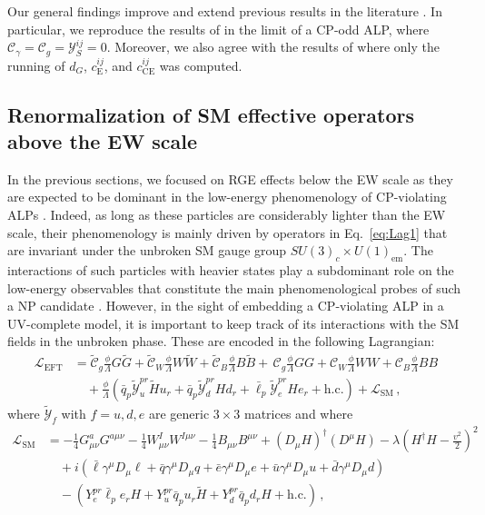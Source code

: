 Our general findings improve and extend previous results in the literature \cite{Marciano:2016yhf,Galda:2023qjx,DiLuzio:2020oah}.
In particular, we reproduce the results of \cite{Galda:2023qjx} in the limit of a CP-odd ALP, where $\mathcal C_\gamma = \mathcal C_g = \mathcal Y_S^{ij} = 0$. Moreover, we also agree with the results of \cite{Marciano:2016yhf,DiLuzio:2020oah} where only the running of $d_G$, $c_{\text{E}}^{ij}$, and $c_{\text{CE}}^{ij}$ was computed.

\subsection{Renormalization of SM effective operators above the EW scale}

In the previous sections, we focused on RGE effects below the EW scale as they are expected to be dominant in the low-energy phenomenology of CP-violating ALPs \cite{Marciano:2016yhf,DiLuzio:2020oah}. Indeed, as long as these particles are considerably lighter than the EW scale, their phenomenology is mainly driven by operators in Eq.~\eqref{eq:Lag1} that are invariant under the unbroken SM gauge group $SU(3)_c\times U(1)_\text{em}$. The interactions of such particles with heavier states play a subdominant role on the low-energy observables that constitute the main phenomenological probes of such a NP candidate \cite{DiLuzio:2020oah,DiLuzio:2023cuk}. However, in the sight of embedding a CP-violating ALP in a UV-complete model, it is important to keep track of its interactions with the SM fields in the unbroken phase.
These are encoded in the following Lagrangian: 
\begin{align}
\mathcal{L}_\text{EFT} &= \tilde{\mathcal{C}}_{g}\frac{\phi}{\Lambda} G\tilde{G} + \tilde{\mathcal{C}}_{W}\frac{\phi}{\Lambda} W\tilde{W}+ \tilde{\mathcal{C}}_{B}\frac{\phi}{\Lambda} B\tilde{B} +\, \mathcal{C}_{g}\frac{\phi}{\Lambda} GG + \mathcal{C}_{W}\frac{\phi}{\Lambda} WW+ \mathcal{C}_{B}\frac{\phi}{\Lambda} BB \nonumber \\
&\quad + \frac{\phi}{\Lambda} \left(\bar{q}_p\tilde{\mathcal{Y}}^{pr}_u\tilde{H}u_r+ \bar{q}_p\tilde{\mathcal{Y}}^{pr}_d H d_r+ \bar{\ell}_p\tilde{\mathcal{Y}}^{pr}_e He_r + \text{h.c.}\right) + \mathcal{L}_{\text{SM}}\,,
\end{align}
%
where $\tilde{\mathcal{Y}}_{f}$ with $f = u,d,e$ are generic $3 \times 3$ matrices and where 
%
\begin{align}
\mathcal{L}_\text{SM} &= -\frac{1}{4}G_{\mu\nu}^aG^{a\mu\nu}-\frac{1}{4}W_{\mu\nu}^IW^{I\mu\nu}-\frac{1}{4}B_{\mu\nu}B^{\mu\nu}+(D_\mu H)^\dagger (D^\mu H)-\lambda \left(H^\dagger H-\frac{v^2}{2}\right)^2 \nonumber \\
&\quad + i (\bar \ell \gamma^\mu D_\mu \ell + \bar q \gamma^\mu D_\mu q + \bar e \gamma^\mu D_\mu e + \bar u \gamma^\mu D_\mu u + \bar d \gamma^\mu D_\mu d) \nonumber \\
&\quad - (Y_e^{pr} \bar \ell_p e_r H + Y_u^{pr} \bar q_p u_r \tilde H + Y_d^{pr} \bar q_p d_r H + \text{h.c.})\,,
\end{align}
